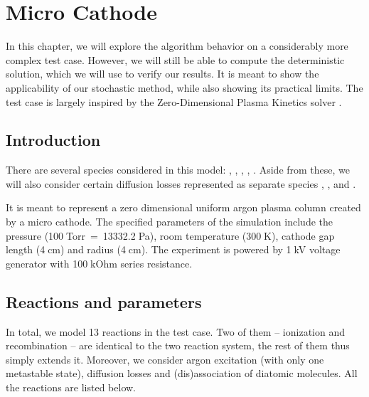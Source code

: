 \chapter{Micro Cathode}

In this chapter, we will explore the algorithm behavior on a considerably more complex test case. However, we will still be able to compute the deterministic solution, which we will use to verify our results. It is meant to show the applicability of our stochastic method, while also showing its practical limits. The test case is largely inspired by the Zero-Dimensional Plasma Kinetics solver \cite{zdplaskin}.

\section{Introduction}

There are several species considered in this model: , , , , . Aside from these, we will also consider certain diffusion losses represented as separate species , , and .

It is meant to represent a zero dimensional uniform argon plasma column created by a micro cathode. The specified parameters of the simulation include the pressure (100$\;$Torr~=~13332.2$\;$Pa), room temperature (300$\;$K), cathode gap length (4$\;$cm) and radius (4$\;$cm). The experiment is powered by 1$\;$kV voltage generator with 100$\;$kOhm series resistance.

\section{Reactions and parameters}

In total, we model 13 reactions in the test case. Two of them -- ionization and recombination -- are identical to the two reaction system, the rest of them thus simply extends it. Moreover, we consider argon excitation (with only one metastable state), diffusion losses and (dis)association of diatomic molecules. All the reactions are listed below.

